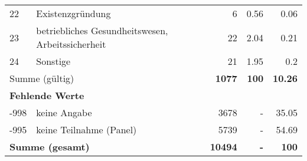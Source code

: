 \begin{longtable}{lXrrr}
        22 & \multicolumn{1}{X}{Existenzgründung} & %
          \num{6} &
          \num[round-mode=places,round-precision=2]{0,56} &
          \num[round-mode=places,round-precision=2]{0,06} \\

        23 & \multicolumn{1}{X}{betriebliches Gesundheitswesen, Arbeitssicherheit} & %
          \num{22} &
          \num[round-mode=places,round-precision=2]{2,04} &
          \num[round-mode=places,round-precision=2]{0,21} \\

        24 & \multicolumn{1}{X}{Sonstige} & %
          \num{21} &
          \num[round-mode=places,round-precision=2]{1,95} &
          \num[round-mode=places,round-precision=2]{0,2} \\

     \midrule
     \multicolumn{2}{l}{Summe (gültig)} &
       \textbf{\num{1077}} &
     \textbf{100} &
       \textbf{\num[round-mode=places,round-precision=2]{10,26}} \\
     \multicolumn{5}{l}{\textbf{Fehlende Werte}}\\
       -998 &
       keine Angabe &
         \num{3678} &
        - &
         \num[round-mode=places,round-precision=2]{35,05} \\
       -995 &
       keine Teilnahme (Panel) &
         \num{5739} &
        - &
         \num[round-mode=places,round-precision=2]{54,69} \\
     \midrule
     \multicolumn{2}{l}{\textbf{Summe (gesamt)}} &
          \textbf{\num{10494}} &
        \textbf{-} &
        \textbf{100} \\
     \bottomrule
     \end{longtable}
     
